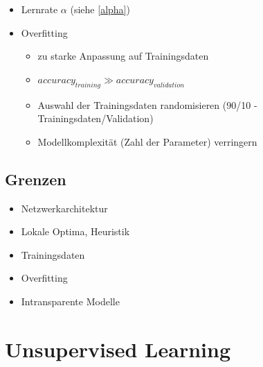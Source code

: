 \documentclass[nonacm=true, language=german]{acmart}
\begin{document}
\begin{itemize}
\begin{itemize}
        \item Lernrate $\alpha$ (siehe \ref{alpha})
        \item Overfitting
        \begin{itemize}
            \item zu starke Anpassung auf Trainingsdaten
            \item $accuracy_{training} \gg accuracy_{validation} $
            \item Auswahl der Trainingsdaten randomisieren (90/10 - Trainingsdaten/Validation)
            \item Modellkomplexität (Zahl der Parameter) verringern
        \end{itemize}
    \end{itemize}
\end{itemize}

\subsection{Grenzen}

\begin{itemize}
    \item Netzwerkarchitektur
    \item Lokale Optima, Heuristik
    \item Trainingsdaten
    \item Overfitting
    \item Intransparente Modelle
\end{itemize}

\section{Unsupervised Learning}
\end{document}

